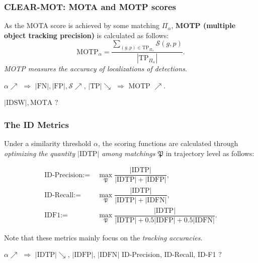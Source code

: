 \documentclass[slidetop, mathserif, dvipsnames]{beamer}
\begin{document}
\begin{frame}
	\frametitle{CLEAR-MOT: MOTA and MOTP scores}
			
	As the MOTA score is achieved by some matching $\Pi_\alpha$, {\bf MOTP (multiple object tracking precision)}
	is calculated as follows:
	\[
		\text{MOTP}_\alpha =
		\dfrac{\sum_{(g,p)\in\text{TP}_{\Pi_\alpha}}\mathcal S(g,p)}{|\text{TP}_{\Pi_\alpha}|}.
	\]
	\emph{\color{red} MOTP measures the accuracy of localizations of detections}.
			
	\quad
			
			
	\vspace{5pt}
		
	$\alpha\nearrow$ $\Rightarrow$ $|\text{FN}|, |\text{FP}|, \mathcal S \nearrow$,
	$|\text{TP}| \searrow$ $\Rightarrow$ MOTP $\nearrow$.

	\vspace{5pt}

	$|\text{IDSW}|, \text{MOTA}$ $?$
	
\end{frame}

\begin{frame}
	\frametitle{The ID Metrics}
			
	Under a similarity threshold $\alpha$, the scoring functions are calculated
	through
	\emph{optimizing the quantity $|\text{IDTP}|$ among matchings $\mathfrak P$}
	in trajectory level as follows:

	\vspace{-15pt}
	\begin{align*}
		\text{ID-Precision} := & ~ \max_{\mathfrak P} \dfrac{|\text{IDTP}|}{|\text{IDTP}| + |\text{IDFP}|}, \\
		\text{ID-Recall} :=    & ~ \max_{\mathfrak P}\dfrac{|\text{IDTP}|}{|\text{IDTP}| + |\text{IDFN}|},  \\
		\text{IDF1} :=         &                                                                            
		~ \max_{\mathfrak P}\dfrac{|\text{IDTP}|}{|\text{IDTP}| + 0.5|\text{IDFP}| + 0.5|\text{IDFN}|}.
	\end{align*}

	Note that these metrics mainly focus on the {\color{olive}\emph{tracking accuracies}}.

	\vspace{5pt}

	$\alpha\nearrow$ $\Rightarrow$ $|\text{IDTP}|\searrow$,
	$|\text{IDFP}|$, $|\text{IDFN}|$ ID-Precision, ID-Recall, ID-F1 $?$

\end{frame}
\end{document}
